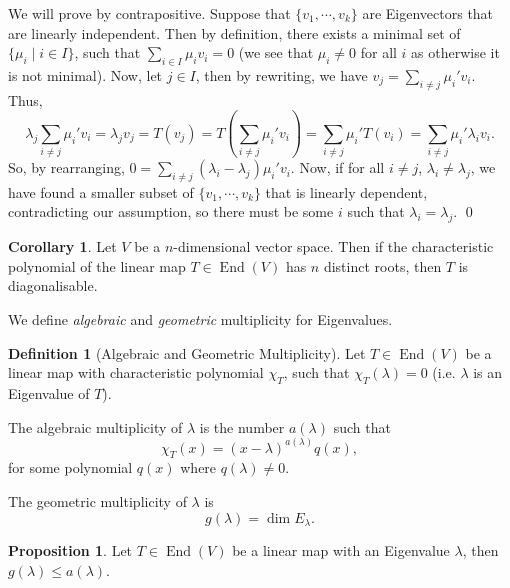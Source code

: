 \documentclass[
]{article}
\theoremstyle{definition}
\newtheorem{prop}{Proposition}[section]
\newtheorem{corollary}{Corollary}[theorem]
\theoremstyle{definition}
\newtheorem{definition}{Definition}[section]
\begin{document}
We will prove by contrapositive. Suppose that \(\{v_1, \cdots, v_k\}\)
are Eigenvectors that are linearly independent. Then by definition,
there exists a minimal set of \(\{\mu_i \mid i \in I\}\), such that
\(\sum_{i \in I} \mu_i v_i = 0\) (we see that \(\mu_i \neq 0\) for all
\(i\) as otherwise it is not minimal). Now, let \(j \in I\), then by
rewriting, we have \(v_j = \sum_{i \neq j}\mu_i' v_i\). Thus, \[
    \lambda_j \sum_{i \neq j} \mu_i' v_i = \lambda_j v_j = T(v_j)
      = T\left(\sum_{i \neq j} \mu_i' v_i\right) 
      = \sum_{i \neq j} \mu_i' T(v_i) 
      = \sum_{i \neq j} \mu_i' \lambda_i v_i.
  \] So, by rearranging,
\(0 = \sum_{i \neq j}(\lambda_i - \lambda_j)\mu_i' v_i\). Now, if for
all \(i \neq j\), \(\lambda_i \neq \lambda_j\), we have found a smaller
subset of \(\{v_1, \cdots, v_k\}\) that is linearly dependent,
contradicting our assumption, so there must be some \(i\) such that
\(\lambda_i = \lambda_j\). \qed

\begin{corollary}
  Let \(V\) be a \(n\)-dimensional vector space. Then if the characteristic 
  polynomial of the linear map \(T \in \mathop{\mathrm{End}}(V)\) has \(n\) distinct roots, then 
  \(T\) is diagonalisable. 
\end{corollary}

We define \emph{algebraic} and \emph{geometric} multiplicity for
Eigenvalues.

\begin{definition}[Algebraic and Geometric Multiplicity]
  Let \(T \in \mathop{\mathrm{End}}(V)\) be a linear map with characteristic polynomial \(\chi_T\),
  such that \(\chi_T(\lambda) = 0\) (i.e. \(\lambda\) is an Eigenvalue of \(T\)).

  The algebraic multiplicity of \(\lambda\) is the number \(a(\lambda)\) such 
  that
  \[\chi_T(x) = (x - \lambda)^{a(\lambda)} q(x),\]
  for some polynomial \(q(x)\) where \(q(\lambda) \neq 0\).

  The geometric multiplicity of \(\lambda\) is
  \[g(\lambda) = \dim E_{\lambda}.\]
\end{definition}

\begin{prop}
  Let \(T \in \mathop{\mathrm{End}}(V)\) be a linear map with an Eigenvalue \(\lambda\), then 
  \(g(\lambda) \le a(\lambda)\).
\end{prop}
\proof
\end{document}
